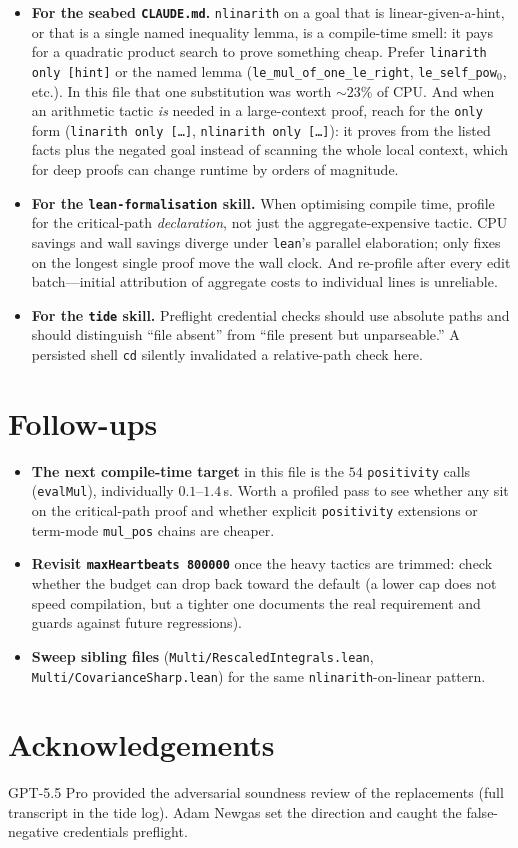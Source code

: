 \documentclass[11pt]{article}
\begin{document}
\begin{itemize}[leftmargin=1.4em]
  \item \textbf{For the seabed \texttt{CLAUDE.md}.} \texttt{nlinarith} on a goal
    that is linear-given-a-hint, or that is a single named inequality lemma, is
    a compile-time smell: it pays for a quadratic product search to prove
    something cheap. Prefer \texttt{linarith only [hint]} or the named lemma
    (\texttt{le\_mul\_of\_one\_le\_right}, \texttt{le\_self\_pow$_0$}, etc.).
    In this file that one substitution was worth $\sim$$23\%$ of CPU. And when an
    arithmetic tactic \emph{is} needed in a large-context proof, reach for the
    \texttt{only} form (\texttt{linarith only [\dots]},
    \texttt{nlinarith only [\dots]}): it proves from the listed facts plus the
    negated goal instead of scanning the whole local context, which for deep
    proofs can change runtime by orders of magnitude.
  \item \textbf{For the \texttt{lean-formalisation} skill.} When optimising
    compile time, profile for the critical-path \emph{declaration}, not just the
    aggregate-expensive tactic. CPU savings and wall savings diverge under
    \texttt{lean}'s parallel elaboration; only fixes on the longest single proof
    move the wall clock. And re-profile after every edit batch---initial
    attribution of aggregate costs to individual lines is unreliable.
  \item \textbf{For the \texttt{tide} skill.} Preflight credential checks should
    use absolute paths and should distinguish ``file absent'' from ``file
    present but unparseable.'' A persisted shell \texttt{cd} silently invalidated
    a relative-path check here.
\end{itemize}

\section{Follow-ups}

\begin{itemize}[leftmargin=1.4em]
  \item \textbf{The next compile-time target} in this file is the $54$
    \texttt{positivity} calls (\texttt{evalMul}), individually $0.1$--$1.4$\,s.
    Worth a profiled pass to see whether any sit on the critical-path proof and
    whether explicit \texttt{positivity} extensions or term-mode \texttt{mul\_pos}
    chains are cheaper.
  \item \textbf{Revisit \texttt{maxHeartbeats 800000}} once the heavy tactics are
    trimmed: check whether the budget can drop back toward the default (a lower
    cap does not speed compilation, but a tighter one documents the real
    requirement and guards against future regressions).
  \item \textbf{Sweep sibling files} (\texttt{Multi/RescaledIntegrals.lean},
    \texttt{Multi/CovarianceSharp.lean}) for the same \texttt{nlinarith}-on-linear
    pattern.
\end{itemize}

\section*{Acknowledgements}

GPT-5.5 Pro provided the adversarial soundness review of the replacements (full
transcript in the tide log). Adam Newgas set the direction and caught the
false-negative credentials preflight.
\end{document}
